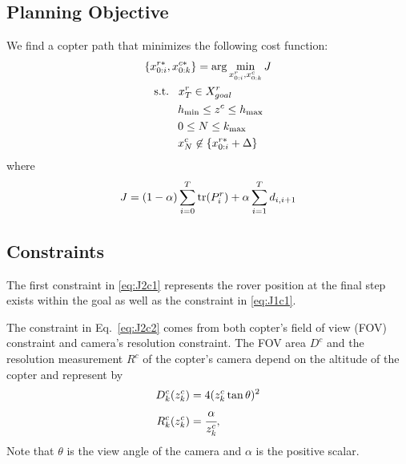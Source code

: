 \documentclass[conference]{IEEEtran}
\begin{document}
\subsection{Planning Objective}
We find a copter path that minimizes the following cost function:
\begin{align}
  &\{ x^{r*}_{0:i}, x^{c*}_{0:k}\}={\rm arg} \min_{x^r_{0:i},x^c_{0:k}} J\\
  &\hspace{3mm}{\rm s.t.}\hspace{3mm}x^r_{T} \in X^r_{goal}\label{eq:J2c1}\\
  &\hspace{10.5mm} h_{\min} \leq z^c \leq h_{\max}\label{eq:J2c2}\\
  &\hspace{10.5mm} 0 \leq N \leq k_{\max}\label{eq:J2c3}\\
  &\hspace{10.5mm} x^c_N \not\in \{ x^{r*}_{0:i}+\Delta \}\label{eq:J2c5}
\end{align}
where
\begin{align}
    J=(1-\alpha) \sum^T_{i=0}  {\rm tr}(P^r_i) +\alpha \sum^T_{i=1} d_{i,i+1}
\end{align}

\subsection{Constraints}

The first constraint in \eqref{eq:J2c1} represents the rover position at the final step exists within the goal as well as the constraint in \eqref{eq:J1c1}.

The constraint in Eq.~\eqref{eq:J2c2} comes from both copter's field of view (FOV) constraint and camera's resolution constraint.
The FOV area $D^c$ and the resolution measurement $R^c$ of the copter's camera depend on the altitude of the copter and represent by
\begin{align}
    D^c_k (z_k^c)&=4 (z_k^c \tan \theta)^2\\
    R^c_k (z_k^c)&=\cfrac{\alpha}{z_k^c} ,
\end{align}
Note that $\theta$ is the view angle of the camera and $\alpha$ is the positive scalar. 
\end{document}
